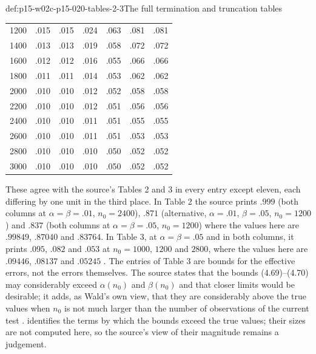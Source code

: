 \begin{hbexample}{def:p15-w02c-p15-020-tables-2-3}{The full termination and truncation tables}
\begin{center}
\begin{tabular}{r|cc|cc|cc}
1200&.015&.015&.024&.063&.081&.081\\
1400&.013&.013&.019&.058&.072&.072\\
1600&.012&.012&.016&.055&.066&.066\\
1800&.011&.011&.014&.053&.062&.062\\
2000&.010&.010&.012&.052&.058&.058\\
2200&.010&.010&.012&.051&.056&.056\\
2400&.010&.010&.011&.051&.055&.055\\
2600&.010&.010&.011&.051&.053&.053\\
2800&.010&.010&.010&.050&.052&.052\\
3000&.010&.010&.010&.050&.052&.052
\end{tabular}
\end{center}
These agree with the source's Tables 2 and 3 in every entry except
eleven, each differing by one unit in the third place. In Table 2 the source
prints \(.999\) (both columns at \(\alpha=\beta=.01\), \(n_0=2400\)),
\(.871\) (alternative, \(\alpha=.01\), \(\beta=.05\), \(n_0=1200\)) and
\(.837\) (both columns at \(\alpha=\beta=.05\), \(n_0=1200\)) where the
values here are \(.99849\), \(.87040\) and \(.83764\). In Table 3, at
\(\alpha=\beta=.05\) and in both columns, it prints \(.095\), \(.082\)
and \(.053\) at
\(n_0=1000\), \(1200\) and \(2800\), where the values here are
\(.09446\), \(.08137\) and \(.05245\)
\cite[Section 4.5, Table 2, p.~152; Section 4.6, Table 3, p.~155]{Wald1945SequentialTests}.
The entries of Table 3 are bounds for the effective errors, not the
errors themselves. The source states that the bounds (4.69)--(4.70) may
considerably exceed \(\alpha(n_0)\) and \(\beta(n_0)\) and that closer
limits would be desirable; it adds, as Wald's own view, that they
are considerably above the true values when \(n_0\) is not much larger
than the number of observations of the current test
\cite[Section 4.6, p.~154]{Wald1945SequentialTests}.
 identifies the terms by
which the bounds exceed the true values; their sizes are not computed
here, so the source's view of their magnitude remains a judgement.
\end{hbexample}

